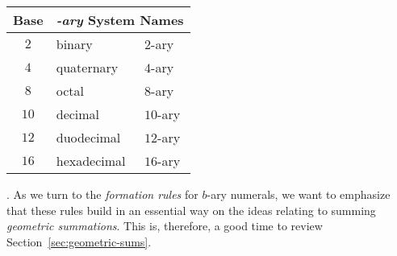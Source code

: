 \smallskip

\begin{tabular}{|c|l|l|}
\hline
{\bf Base} & \multicolumn{2}{c}{\bf {\em -ary} System Names}  \\
\hline
$2$   & binary     & $2$-ary  \\
\hline 
$4$   & quaternary & $4$-ary  \\
\hline
$8$   & octal      & $8$-ary \\
\hline
$10$  & decimal    & $10$-ary  \\
\hline
$12$  & duodecimal & $12$-ary  \\
\hline
$16$  & hexadecimal & $16$-ary \\
\hline
\end{tabular}

\bigskip

.
As we turn to the {\it formation rules} for $b$-ary numerals, we want
to emphasize that these rules build in an essential way on the ideas
relating to summing {\em geometric summations}.  This is, therefore, a
good time to review Section~\ref{sec:geometric-sums}.

\medskip


